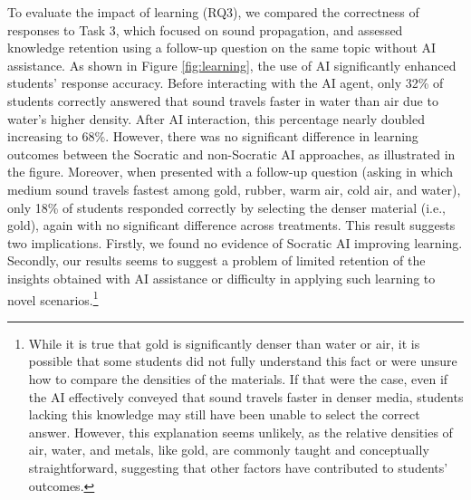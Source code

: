 \documentclass[
  11pt,
]{article}
\begin{document}
To evaluate the impact of learning (RQ3), we compared the correctness of responses to Task 3, which focused on sound propagation, and assessed knowledge retention using a follow-up question on the same topic without AI assistance. As shown in Figure \ref{fig:learning}, the use of AI significantly enhanced students' response accuracy. Before interacting with the AI agent, only 32\% of students correctly answered that sound travels faster in water than air due to water's higher density. After AI interaction, this percentage nearly doubled increasing to 68\%. However, there was no significant difference in learning outcomes between the Socratic and non-Socratic AI approaches, as illustrated in the figure. Moreover, when presented with a follow-up question (asking in which medium sound travels fastest among gold, rubber, warm air, cold air, and water), only 18\% of students responded correctly by selecting the denser material (i.e., gold), again with no significant difference across treatments. This result suggests two implications. Firstly, we found no evidence of Socratic AI improving learning. Secondly, our results seems to suggest a problem of limited retention of the insights obtained with AI assistance or difficulty in applying such learning to novel scenarios.\footnote{While it is true that gold is significantly denser than water or air, it is possible that some students did not fully understand this fact or were unsure how to compare the densities of the materials. If that were the case, even if the AI effectively conveyed that sound travels faster in denser media, students lacking this knowledge may still have been unable to select the correct answer. However, this explanation seems unlikely, as the relative densities of air, water, and metals, like gold, are commonly taught and conceptually straightforward, suggesting that other factors have contributed to students' outcomes.}
\end{document}
